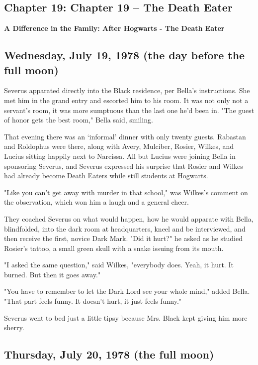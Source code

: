 \documentclass[a4paper,11pt]{article}
\begin{document}
\subsection{Chapter 19: Chapter 19 – The Death Eater}

\textbf{A Difference in the Family: After Hogwarts - The Death Eater}

\subsection{Wednesday, July 19, 1978 (the day before the full moon)}

Severus apparated directly into the Black residence, per Bella's instructions. She met him in the grand entry and escorted him to his room. It was not only not a servant's room, it was more sumptuous than the last one he'd been in. "The guest of honor gets the best room," Bella said, smiling.

That evening there was an `informal' dinner with only twenty guests. Rabastan and Roldophus were there, along with Avery, Mulciber, Rosier, Wilkes, and Lucius sitting happily next to Narcissa. All but Lucius were joining Bella in sponsoring Severus, and Severus expressed his surprise that Rosier and Wilkes had already become Death Eaters while still students at Hogwarts.

"Like you can't get away with murder in that school," was Wilkes's comment on the observation, which won him a laugh and a general cheer.

They coached Severus on what would happen, how he would apparate with Bella, blindfolded, into the dark room at headquarters, kneel and be interviewed, and then receive the first, novice Dark Mark. "Did it hurt?" he asked as he studied Rosier's tattoo, a small green skull with a snake issuing from its mouth.

"I asked the same question," said Wilkes, "everybody does. Yeah, it hurt. It burned. But then it goes away."

"You have to remember to let the Dark Lord see your whole mind," added Bella. "That part feels funny. It doesn't hurt, it just feels funny."

Severus went to bed just a little tipsy because Mrs. Black kept giving him more sherry.

\subsection{Thursday, July 20, 1978 (the full moon)}
\end{document}
